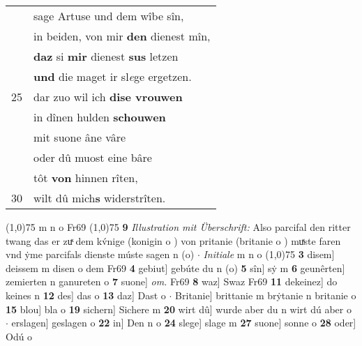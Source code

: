 \documentclass[8pt,a4paper,notitlepage]{article}
\begin{document}
\begin{table}[ht]
\begin{minipage}[t]{0.5\linewidth}
\begin{tabular}{rl}
 & sage Artuse und dem wîbe sîn,\\ 
 & in beiden, von mir \textbf{den} dienest mîn,\\ 
 & \textbf{daz} si \textbf{mir} dienest \textbf{sus} letzen\\ 
 & \textbf{und} die maget ir sl\textit{e}ge ergetzen.\\ 
25 & dar zuo wil ich \textbf{dise vrouwen}\\ 
 & in dînen hulden \textbf{schouwen}\\ 
 & mit suone âne vâre\\ 
 & oder dû muost eine bâre\\ 
 & tôt \textbf{von} hinnen rîten,\\ 
30 & wilt dû mich\textbf{s} widerstrîten.\\ 
\end{tabular}
\scriptsize
\line(1,0){75} \newline
m n o Fr69 \newline
\line(1,0){75} \newline
\textbf{9} \textit{Illustration mit Überschrift:} Also parcifal den ritter twang das er zuͯ dem kv́nige (konigin o  ) von pritanie (britanie o  ) muͯste faren vnd ẏme parcifals dienste múste sagen n (o)   $\cdot$ \textit{Initiale} m n o  \newline
\line(1,0){75} \newline
\textbf{3} disem] deissem m disen o dem Fr69 \textbf{4} gebiut] gebúte du n (o) \textbf{5} sîn] sẏ m \textbf{6} geunêrten] zemierten n ganureten o \textbf{7} suone] \textit{om.} Fr69 \textbf{8} waz] Swaz Fr69 \textbf{11} dekeinez] do keines n \textbf{12} des] das o \textbf{13} daz] Dast o  $\cdot$ Britanie] brittanie m brẏtanie n britanie o \textbf{15} blou] bla o \textbf{19} sichern] Sichere m \textbf{20} wirt dû] wurde aber du n wirt dú aber o  $\cdot$ erslagen] geslagen o \textbf{22} in] Den n o \textbf{24} slege] slage m \textbf{27} suone] sonne o \textbf{28} oder] Odú o \newline
\end{minipage}
\end{table}
\newpage
\end{document}
